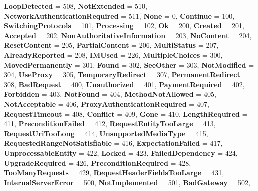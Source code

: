 \begin{DoxyCompactItemize}
{\bfseries Loop\+Detected} = 508, 
\newline
{\bfseries Not\+Extended} = 510, 
{\bfseries Network\+Authentication\+Required} = 511, 
{\bfseries None} = 0, 
{\bfseries Continue} = 100, 
\newline
{\bfseries Switching\+Protocols} = 101, 
{\bfseries Processing} = 102, 
{\bfseries Ok} = 200, 
{\bfseries Created} = 201, 
\newline
{\bfseries Accepted} = 202, 
{\bfseries Non\+Authoritative\+Information} = 203, 
{\bfseries No\+Content} = 204, 
{\bfseries Reset\+Content} = 205, 
\newline
{\bfseries Partial\+Content} = 206, 
{\bfseries Multi\+Status} = 207, 
{\bfseries Already\+Reported} = 208, 
{\bfseries I\+M\+Used} = 226, 
\newline
{\bfseries Multiple\+Choices} = 300, 
{\bfseries Moved\+Permanently} = 301, 
{\bfseries Found} = 302, 
{\bfseries See\+Other} = 303, 
\newline
{\bfseries Not\+Modified} = 304, 
{\bfseries Use\+Proxy} = 305, 
{\bfseries Temporary\+Redirect} = 307, 
{\bfseries Permanent\+Redirect} = 308, 
\newline
{\bfseries Bad\+Request} = 400, 
{\bfseries Unauthorized} = 401, 
{\bfseries Payment\+Required} = 402, 
{\bfseries Forbidden} = 403, 
\newline
{\bfseries Not\+Found} = 404, 
{\bfseries Method\+Not\+Allowed} = 405, 
{\bfseries Not\+Acceptable} = 406, 
{\bfseries Proxy\+Authentication\+Required} = 407, 
\newline
{\bfseries Request\+Timeout} = 408, 
{\bfseries Conflict} = 409, 
{\bfseries Gone} = 410, 
{\bfseries Length\+Required} = 411, 
\newline
{\bfseries Precondition\+Failed} = 412, 
{\bfseries Request\+Entity\+Too\+Large} = 413, 
{\bfseries Request\+Uri\+Too\+Long} = 414, 
{\bfseries Unsupported\+Media\+Type} = 415, 
\newline
{\bfseries Requested\+Range\+Not\+Satisfiable} = 416, 
{\bfseries Expectation\+Failed} = 417, 
{\bfseries Unprocessable\+Entity} = 422, 
{\bfseries Locked} = 423, 
\newline
{\bfseries Failed\+Dependency} = 424, 
{\bfseries Upgrade\+Required} = 426, 
{\bfseries Precondition\+Required} = 428, 
{\bfseries Too\+Many\+Requests} = 429, 
\newline
{\bfseries Request\+Header\+Fields\+Too\+Large} = 431, 
{\bfseries Internal\+Server\+Error} = 500, 
{\bfseries Not\+Implemented} = 501, 
{\bfseries Bad\+Gateway} = 502, 
\newline

\end{DoxyCompactItemize}
